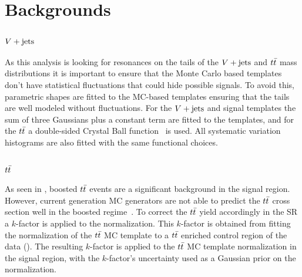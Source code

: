 \section{Backgrounds}\label{sec:analysis_backgrounds}

\subsection{$V + \text{jets}$}

As this analysis is looking for resonances on the tails of the $V + \text{jets}$ and $t\bar{t}$ mass distributions it is important to ensure that the Monte Carlo based templates don't have statistical fluctuations that could hide possible signals.
To avoid this, parametric shapes are fitted to the MC-based templates ensuring that the tails are well modeled without fluctuations.
For the $V + \text{jets}$ and signal templates the sum of three Gaussians plus a constant term are fitted to the templates, and for the $t\bar{t}$ a double-sided Crystal Ball function~\cite{Gaiser:1982yw} is used.
All systematic variation histograms are also fitted with the same functional choices.

\subsection{$t\bar{t}$}\label{sec:ttbar}

As seen in , boosted $t\bar{t}$ events are a significant background in the signal region.
However, current generation MC generators are not able to predict the $t\bar{t}$ cross section well in the boosted regime~\cite{ATL-PHYS-PUB-2018-009}.
To correct the $t\bar{t}$ yield accordingly in the SR a $k$-factor is applied to the normalization.
This $k$-factor is obtained from fitting the normalization of the $t\bar{t}$ MC template to a $t\bar{t}$ enriched control region of the data (\CRttbar{}).
The resulting $k$-factor is applied to the $t\bar{t}$ MC template normalization in the signal region, with the $k$-factor's uncertainty used as a Gaussian prior on the normalization.

